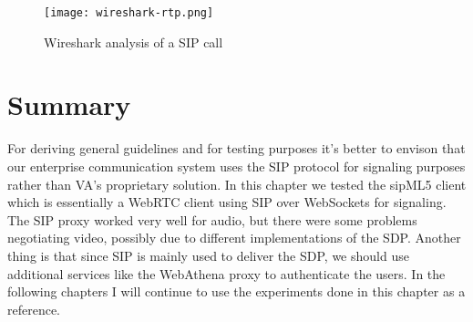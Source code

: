 \begin{figure}[here]
\centerline{\texttt{[image: wireshark-rtp.png]}}
\caption{Wireshark analysis of a SIP call}
\label{fig:wireshark-sip-call}
\end{figure}

\newpage
\section{Summary}
For deriving general guidelines and for testing purposes it's better to envison that our enterprise communication system uses the SIP protocol for signaling purposes rather than VA's proprietary solution. In this chapter we tested the sipML5 client which is essentially a WebRTC client using SIP over WebSockets for signaling. The SIP proxy worked very well for audio, but there were some problems negotiating video, possibly due to different implementations of the SDP. Another thing is that since SIP is mainly used to deliver the SDP, we should use additional services like the WebAthena proxy to authenticate the users. In the following chapters I will continue to use the experiments done in this chapter as a reference.